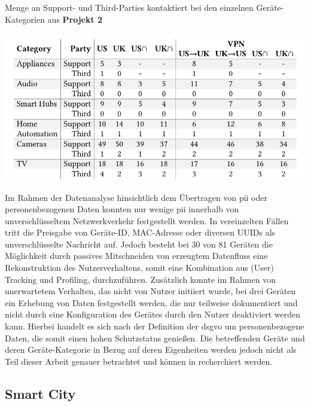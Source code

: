 \begin{table}
    \caption{Menge an Support- und Third-Parties kontaktiert bei den einzelnen Geräte-Kategorien aus \textbf{Projekt 2} \cite{Ren2019}}
    \includegraphics[width=\textwidth]{main/pictures/projekt_two/Non_First_Party_By_Category}
    \label{table:non-first-party-by-device}
\end{table}

\noindent Im Rahmen der Datenanalyse hinsichtlich dem Übertragen von \ac{pii} oder personenbezogenen Daten konnten nur wenige \ac{pii} innerhalb von unverschlüsseltem Netzwerkverkehr festgestellt werden. In vereinzelten Fällen tritt die Preisgabe von Geräte-ID, MAC-Adresse oder diversen UUIDs als unverschlüsselte Nachricht auf. 
Jedoch besteht bei 30 von 81 Geräten die Möglichkeit durch passives Mitschneiden von erzeugtem Datenfluss eine Rekonstruktion des Nutzerverhaltens, somit eine Kombination aus (User) Tracking und Profiling, durchzuführen. 
Zusätzlich konnte im Rahmen von unerwartetem Verhalten, das nicht von Nutzer initiiert wurde, bei drei Geräten ein Erhebung von Daten festgestellt werden, die nur teilweise dokumentiert und nicht durch eine Konfiguration des Gerätes durch den Nutzer deaktiviert werden kann. 
Hierbei handelt es sich nach der Definition der \ac{dsgvo} um personenbezogene Daten, die somit einen hohen Schutzstatus genießen. Die betreffenden Geräte und deren Geräte-Kategorie in Bezug auf deren Eigenheiten werden jedoch nicht als Teil dieser Arbeit genauer betrachtet und können in \cite{Ren2019} recherchiert werden.

\subsection{Smart City}
\label{sec:Analyse der Datenerhebung:ssec:Smart City}

